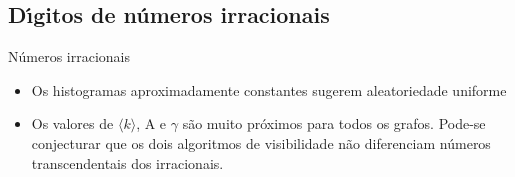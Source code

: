 \documentclass[12pt,
aspectratio=169,
]{beamer}
\begin{document}
\subsection{D\'\i gitos de n\'umeros irracionais}


\begin{frame}{N\'umeros irracionais}

\begin{itemize}
    \item Os histogramas aproximadamente constantes sugerem aleatoriedade uniforme
    \item Os valores de $\langle k \rangle$, A e $\gamma$ s\~ao muito pr\'oximos para todos os grafos. Pode-se conjecturar que os dois algoritmos de visibilidade n\~ao diferenciam n\'umeros transcendentais dos irracionais. 
\end{itemize}
\end{frame}
\end{document}
